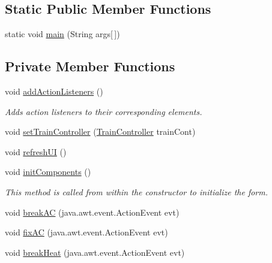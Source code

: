 \subsection*{Static Public Member Functions}
\begin{DoxyCompactItemize}
\item 
static void \hyperlink{classTrainControllerComps_1_1TCTestConsole_ac357695bde522e9b9f51b9b8231f6491}{main} (String args\mbox{[}$\,$\mbox{]})
\end{DoxyCompactItemize}
\subsection*{Private Member Functions}
\begin{DoxyCompactItemize}
\item 
void \hyperlink{classTrainControllerComps_1_1TCTestConsole_a6dbf679049bb88386a66eb60368f1e23}{add\+Action\+Listeners} ()
\begin{DoxyCompactList}\small\item\em Adds action listeners to their corresponding elements. \end{DoxyCompactList}\item 
void \hyperlink{classTrainControllerComps_1_1TCTestConsole_a44225d3560eda9d1d281a21b6c4d9793}{set\+Train\+Controller} (\hyperlink{classTrainControllerComps_1_1TrainController}{Train\+Controller} train\+Cont)
\item 
void \hyperlink{classTrainControllerComps_1_1TCTestConsole_a8c36f9ef39a0e5b17ff982eb9a5fb2d1}{refresh\+UI} ()
\item 
void \hyperlink{classTrainControllerComps_1_1TCTestConsole_a0ce4f7085d384256e806c978e19521cf}{init\+Components} ()
\begin{DoxyCompactList}\small\item\em This method is called from within the constructor to initialize the form. \end{DoxyCompactList}\item 
void \hyperlink{classTrainControllerComps_1_1TCTestConsole_a719ba5669ea8d3015b18f7534ac7aef8}{break\+AC} (java.\+awt.\+event.\+Action\+Event evt)
\item 
void \hyperlink{classTrainControllerComps_1_1TCTestConsole_aa21461aec8a7c5e82a16aa4170fd88d2}{fix\+AC} (java.\+awt.\+event.\+Action\+Event evt)
\item 
void \hyperlink{classTrainControllerComps_1_1TCTestConsole_a4183ab4b832ba4004efe36268e2d42e1}{break\+Heat} (java.\+awt.\+event.\+Action\+Event evt)
\item 

\end{DoxyCompactItemize}
